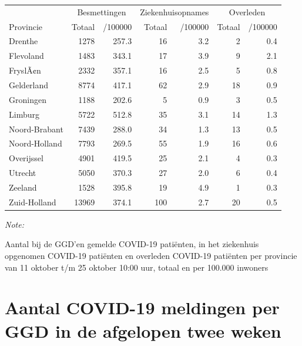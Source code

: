 \documentclass[
  english,
  man,floatsintext]{apa6}
\begin{document}
\begin{table}
\centering
\begin{threeparttable}
\begin{tabular}{lrrrrrr}
\toprule
\multicolumn{1}{c}{ } & \multicolumn{2}{c}{Besmettingen} & \multicolumn{2}{c}{Ziekenhuisopnames} & \multicolumn{2}{c}{Overleden} \\
\cmidrule(l{3pt}r{3pt}){2-3} \cmidrule(l{3pt}r{3pt}){4-5} \cmidrule(l{3pt}r{3pt}){6-7}
Provincie & Totaal & /100000 & Totaal & /100000 & Totaal & /100000\\
\midrule
Drenthe & 1278 & 257.3 & 16 & 3.2 & 2 & 0.4\\
Flevoland & 1483 & 343.1 & 17 & 3.9 & 9 & 2.1\\
FryslÃ¢n & 2332 & 357.1 & 16 & 2.5 & 5 & 0.8\\
Gelderland & 8774 & 417.1 & 62 & 2.9 & 18 & 0.9\\
Groningen & 1188 & 202.6 & 5 & 0.9 & 3 & 0.5\\
Limburg & 5722 & 512.8 & 35 & 3.1 & 14 & 1.3\\
Noord-Brabant & 7439 & 288.0 & 34 & 1.3 & 13 & 0.5\\
Noord-Holland & 7793 & 269.5 & 55 & 1.9 & 16 & 0.6\\
Overijssel & 4901 & 419.5 & 25 & 2.1 & 4 & 0.3\\
Utrecht & 5050 & 370.3 & 27 & 2.0 & 6 & 0.4\\
Zeeland & 1528 & 395.8 & 19 & 4.9 & 1 & 0.3\\
Zuid-Holland & 13969 & 374.1 & 100 & 2.7 & 20 & 0.5\\
\bottomrule
\end{tabular}
\begin{tablenotes}
\item \textit{Note: } 
\item Aantal bij de GGD’en gemelde COVID-19 patiënten, in het ziekenhuis opgenomen COVID-19 patiënten en overleden COVID-19 patiënten per provincie van 11 oktober t/m 25 oktober 10:00 uur, totaal en per 100.000 inwoners
\end{tablenotes}
\end{threeparttable}
\end{table}

\newpage

\hypertarget{aantal-covid-19-meldingen-per-ggd-in-de-afgelopen-twee-weken}{%
\section{Aantal COVID-19 meldingen per GGD in de afgelopen twee weken}\label{aantal-covid-19-meldingen-per-ggd-in-de-afgelopen-twee-weken}}
\end{document}
